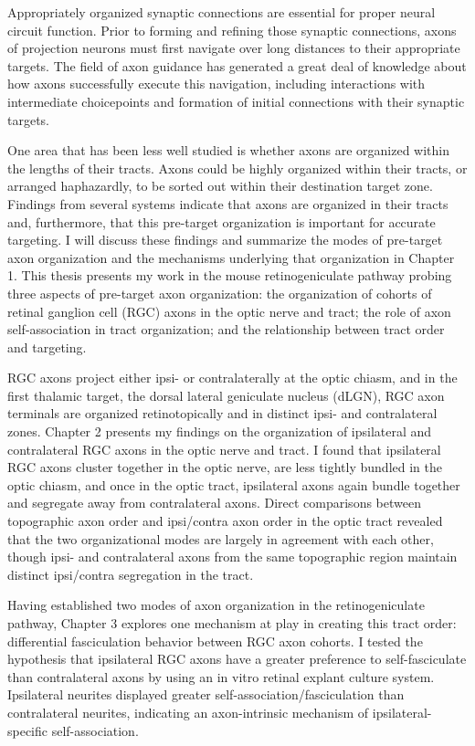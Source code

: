 Appropriately organized synaptic connections are essential for proper neural circuit function.
Prior to forming and refining those synaptic connections, axons of projection neurons must first navigate over long distances to their appropriate targets.
The field of axon guidance has generated a great deal of knowledge about how axons successfully execute this navigation, including interactions with intermediate choicepoints and formation of initial connections with their synaptic targets.

One area that has been less well studied is whether axons are organized within the lengths of their tracts.
Axons could be highly organized within their tracts, or arranged haphazardly, to be sorted out within their destination target zone.
Findings from several systems indicate that axons are organized in their tracts and, furthermore, that this pre-target organization is important for accurate targeting.
I will discuss these findings and summarize the modes of pre-target axon organization and the mechanisms underlying that organization in Chapter 1.
This thesis presents my work in the mouse retinogeniculate pathway probing three aspects of pre-target axon organization: the organization of cohorts of retinal ganglion cell (RGC) axons in the optic nerve and tract; the role of axon self-association in tract organization; and the relationship between tract order and targeting. 

RGC axons project either ipsi- or contralaterally at the optic chiasm, and in the first thalamic target, the dorsal lateral geniculate nucleus (dLGN), RGC axon terminals are organized retinotopically and in distinct ipsi- and contralateral zones.
Chapter 2 presents my findings on the organization of ipsilateral and contralateral RGC axons in the optic nerve and tract.
I found that ipsilateral RGC axons cluster together in the optic nerve, are less tightly bundled in the optic chiasm, and once in the optic tract, ipsilateral axons again bundle together and segregate away from contralateral axons.
Direct comparisons between topographic axon order and ipsi/contra axon order in the optic tract revealed that the two organizational modes are largely in agreement with each other, though ipsi- and contralateral axons from the same topographic region maintain distinct ipsi/contra segregation in the tract.

Having established two modes of axon organization in the retinogeniculate pathway, Chapter 3 explores one mechanism at play in creating this tract order: differential fasciculation behavior between RGC axon cohorts.
I tested the hypothesis that ipsilateral RGC axons have a greater preference to self-fasciculate than contralateral axons by using an in vitro retinal explant culture system.
Ipsilateral neurites displayed greater self-association/fasciculation than contralateral neurites, indicating an axon-intrinsic mechanism of ipsilateral-specific self-association. 

